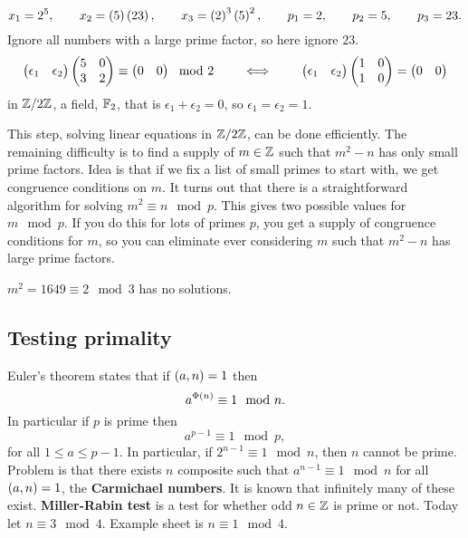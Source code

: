 \begin{example2}
$$ x_1 = 2^5, \qquad x_2 = \left( 5 \right)\left( 23 \right), \qquad x_3 = \left( 2 \right)^3\left( 5 \right)^2, \qquad p_1 = 2, \qquad p_2 = 5, \qquad p_3 = 23. $$
Ignore all numbers with a large prime factor, so here ignore $ 23 $.
$$ \begin{pmatrix} \epsilon_1 & \epsilon_2 \end{pmatrix} \begin{pmatrix} 5 & 0 \\ 3 & 2 \end{pmatrix} \equiv \begin{pmatrix} 0 & 0 \end{pmatrix} \mod 2 \qquad \iff \qquad \begin{pmatrix} \epsilon_1 & \epsilon_2 \end{pmatrix} \begin{pmatrix} 1 & 0 \\ 1 & 0 \end{pmatrix} = \begin{pmatrix} 0 & 0 \end{pmatrix} $$
in $ \mathbb{Z} / 2\mathbb{Z} $, a field, $ \mathbb{F}_2 $, that is $ \epsilon_1 + \epsilon_2 = 0 $, so $ \epsilon_1 = \epsilon_2 = 1 $.
\end{example2}

This step, solving linear equations in $ \mathbb{Z} / 2\mathbb{Z} $, can be done efficiently. The remaining difficulty is to find a supply of $ m \in \mathbb{Z} $ such that $ m^2 - n $ has only small prime factors. Idea is that if we fix a list of small primes to start with, we get congruence conditions on $ m $. It turns out that there is a straightforward algorithm for solving $ m^2 \equiv n \mod p $. This gives two possible values for $ m \mod p $. If you do this for lots of primes $ p $, you get a supply of congruence conditions for $ m $, so you can eliminate ever considering $ m $ such that $ m^2 - n $ has large prime factors.

\begin{example2}
$ m^2 = 1649 \equiv 2 \mod 3 $ has no solutions.
\end{example2}


\subsection{Testing primality}

Euler's theorem states that if $ \left( a, n \right) = 1 $ then
$$ a^{\Phi\left( n \right)} \equiv 1 \mod n. $$
In particular if $ p $ is prime then
$$ a^{p - 1} \equiv 1 \mod p, $$
for all $ 1 \le a \le p - 1 $. In particular, if $ 2^{n - 1} \equiv 1 \mod n $, then $ n $ cannot be prime. Problem is that there exists $ n $ composite such that $ a^{n - 1} \equiv 1 \mod n $ for all $ \left( a, n \right) = 1 $, the \textbf{Carmichael numbers}. It is known that infinitely many of these exist. \textbf{Miller-Rabin test} is a test for whether odd $ n \in \mathbb{Z} $ is prime or not. Today let $ n \equiv 3 \mod 4 $. Example sheet is $ n \equiv 1 \mod 4 $.

